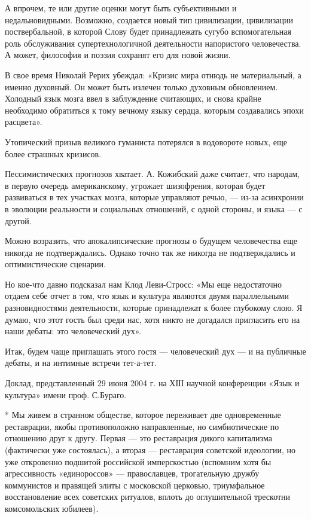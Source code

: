 А впрочем, те или другие оценки могут быть субъективными и недальновидными.
Возможно, создается новый тип цивилизации, цивилизации поствербальной, в
которой Слову будет принадлежать сугубо вспомогательная роль обслуживания
супертехнологичной деятельности напористого человечества. А может, философия и
поэзия сохранят его для новой жизни.

В свое время Николай Рерих убеждал: «Кризис мира отнюдь не материальный, а
именно духовный. Он может быть излечен только духовным обновлением. Холодный
язык мозга ввел в заблуждение считающих, и снова крайне необходимо обратиться к
тому вечному языку сердца, которым создавались эпохи расцвета».

Утопический призыв великого гуманиста потерялся в водовороте новых, еще более
страшных кризисов.

Пессимистических прогнозов хватает. А. Кожибский даже считает, что народам, в
первую очередь американскому, угрожает шизофрения, которая будет развиваться в
тех участках мозга, которые управляют речью, --- из-за асинхронии в эволюции
реальности и социальных отношений, с одной стороны, и языка --- с другой.

Можно возразить, что апокалипсические прогнозы о будущем человечества еще
никогда не подтверждались. Однако точно так же никогда не подтверждались и
оптимистические сценарии.

Но кое-что давно подсказал нам Клод Леви-Стросс: «Мы еще недостаточно отдаем
себе отчет в том, что язык и культура являются двумя параллельными
разновидностями деятельности, которые принадлежат к более глубокому слою. Я
думаю, что этот гость был среди нас, хотя никто не догадался пригласить его на
наши дебаты: это человеческий дух».

Итак, будем чаще приглашать этого гостя --- человеческий дух --- и на публичные
дебаты, и на интимные встречи тет-а-тет.

Доклад, представленный 29 июня 2004 г. на ХІІІ научной конференции «Язык и
культура» имени проф. С.Бураго.

* Мы живем в странном обществе, которое переживает две одновременные
реставрации, якобы противоположно направленные, но симбиотические по отношению
друг к другу. Первая --- это реставрация дикого капитализма (фактически уже
состоялась), а вторая --- реставрация советской идеологии, но уже откровенно
подшитой российской имперскостью (вспомним хотя бы агрессивность «единороссов»
--- православцев, трогательную дружбу коммунистов и правящей элиты с московской
церковью, триумфальное восстановление всех советских ритуалов, вплоть до
оглушительной трескотни комсомольских юбилеев).
